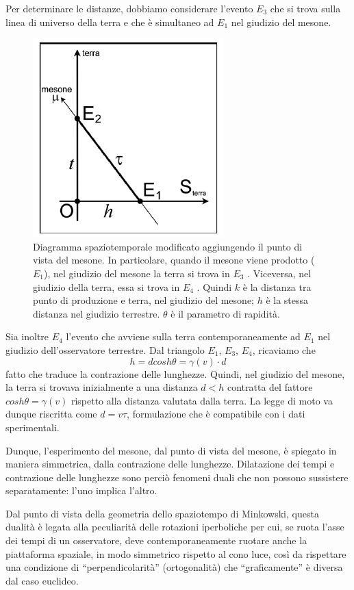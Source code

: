 Per determinare le distanze, dobbiamo considerare l'evento $E_3$ che si trova sulla linea
di universo della terra e che è simultaneo ad $E_1$ nel giudizio del mesone.
\begin{figure}[htbp]
   \centering
   \includegraphics[scale=1]{immagini/conferme_relspec/diagramma_mu}
   \caption{\label{diagramma_mu}Diagramma spaziotemporale modificato aggiungendo il punto
di vista del mesone. In particolare, quando il mesone viene prodotto ($E_1$), nel
giudizio del mesone la terra si trova in $E_3$ . Viceversa, nel giudizio della terra,
essa si trova in $E_4$ . Quindi $k$ è la distanza tra punto di produzione e terra,
nel giudizio del mesone; $h$ è la stessa distanza nel giudizio terrestre. $\theta$ è il
parametro di rapidità.}
\end{figure}

Sia inoltre $E_4$ l'evento che avviene sulla terra contemporaneamente ad $E_1$ nel
giudizio dell'osservatore terrestre. Dal triangolo $E_1$, $E_3$, $E_4$, ricaviamo che
\[ h = d cosh \theta = \gamma(v) \cdot d \]
fatto che traduce la contrazione delle lunghezze. Quindi, nel giudizio del
mesone, la terra si trovava inizialmente a una distanza $d < h$ contratta del
fattore $cosh \theta = \gamma(v)$ rispetto alla distanza valutata dalla terra. La legge di
moto va dunque riscritta come
$d = v\tau$,
formulazione che è compatibile con i dati sperimentali.

Dunque, l'esperimento del mesone, dal punto di vista del mesone, è spiegato 
in maniera simmetrica, dalla contrazione delle lunghezze. Dilatazione
dei tempi e contrazione delle lunghezze sono perciò fenomeni duali che non
possono sussistere separatamente: l'uno implica l'altro. 

Dal punto di vista della geometria dello spaziotempo di
Minkowski, questa dualità è legata alla peculiarità delle rotazioni iperboliche
per cui, se ruota l'asse dei tempi di un osservatore, deve contemporaneamente
ruotare anche la piattaforma spaziale, in modo simmetrico rispetto al cono
luce, così da rispettare una condizione di ``perpendicolarità'' (ortogonalità) 
che ``graficamente'' è diversa dal caso euclideo.

